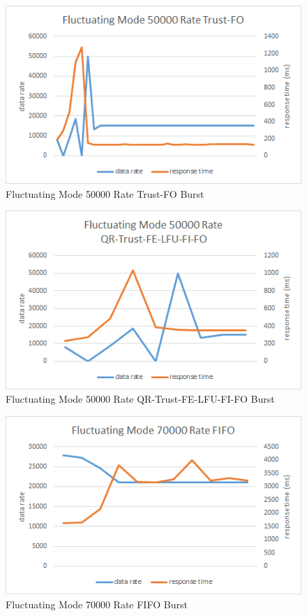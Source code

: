 \begin{figure}[!htbp]
	\centering
	\includegraphics[width=\textwidth]{img/app3-f-50000-trustfo.png}
	\caption{Fluctuating Mode 50000 Rate Trust-FO Burst}
\end{figure}
\begin{figure}[!htbp]
	\centering
	\includegraphics[width=\textwidth]{img/app3-f-50000-qrtrustfelfufifo.png}
	\caption{Fluctuating Mode 50000 Rate QR-Trust-FE-LFU-FI-FO Burst}
\end{figure}
\begin{figure}[!htbp]
	\centering
	\includegraphics[width=\textwidth]{img/app3-f-70000-fifo.png}
	\caption{Fluctuating Mode 70000 Rate FIFO Burst}
\end{figure}
